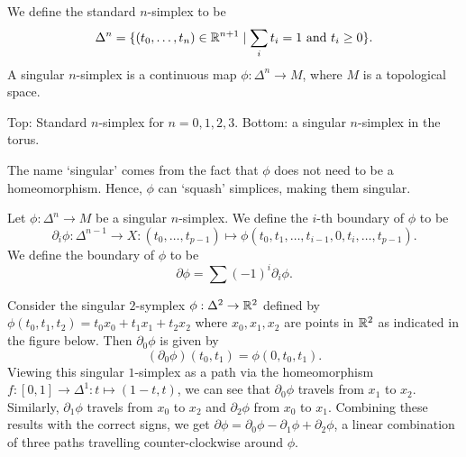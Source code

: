 \begin{definition}
    We define the standard $n$-simplex to be \[\Delta^{n} = \{(t_0, \ldots, t_n) \in \mathbb{R}^{n+1}  \mid  \sum_i t_i = 1 \text{ and }  t_i \ge  0\}.\]
    A singular $n$-simplex is a continuous map $\phi: \Delta^{n} \to M$, where $M$ is a topological space. 
\end{definition}
\begin{marginfigure}
    \centering
    \caption{Top: Standard $n$-simplex for $n = 0, 1, 2, 3$. Bottom: a singular $n$-simplex in the torus.}
    \label{fig:definition-simplex}
\end{marginfigure}
\begin{remark}
    The name `singular' comes from the fact that $\phi$ does not need to be a homeomorphism.
    Hence, $\phi$ can `squash' simplices, making them singular.
\end{remark}
\begin{definition}
    Let $\phi: \Delta^{n} \to  M$ be a singular $n$-simplex.
    We define the $i$-th boundary of $\phi$ to be
    \[
        \partial_i \phi: \Delta^{n-1} \to  X: (t_0, \ldots, t_{p-1}) \mapsto \phi(t_0, t_1, \ldots, t_{i-1}, 0, t_i, \ldots, t_{p-1})
    .\] 
    We define the boundary of $\phi$ to be
     \[
         \partial \phi = \sum (-1)^{i} \partial_i \phi
    .\] 
\end{definition}
\begin{eg}
    Consider the singular $2$-symplex $\phi: \Delta^{2} \to  \mathbb{R}^2$ defined by $\phi(t_0, t_1, t_2) = t_0 x_0 + t_1 x_1 + t_2 x_2$ where $x_0, x_1, x_2$ are points in $\mathbb{R}^2$ as indicated in the figure below.
    Then $\partial_0 \phi$ is given by
    \[
        (\partial_0 \phi)(t_0, t_1) = \phi(0, t_0, t_1)
    .\]
    Viewing this singular $1$-simplex as a path via the homeomorphism $f: [0,1] \to  \Delta^{1}: t \mapsto (1-t, t)$, we can see that $\partial_0 \phi$ travels from $x_1$ to $ x_2$.
    Similarly, $\partial_1 \phi$ travels from $x_0$ to $ x_2$ and $\partial_2 \phi$  from  $x_0$ to $ x_1$.
    Combining these results with the correct signs, we get $\partial \phi = \partial_0\phi - \partial_1 \phi +\partial_2\phi$, a linear combination of three paths travelling counter-clockwise around $\phi$.

    \begin{figure}[H]
        \centering
    \end{figure}
\end{eg}


